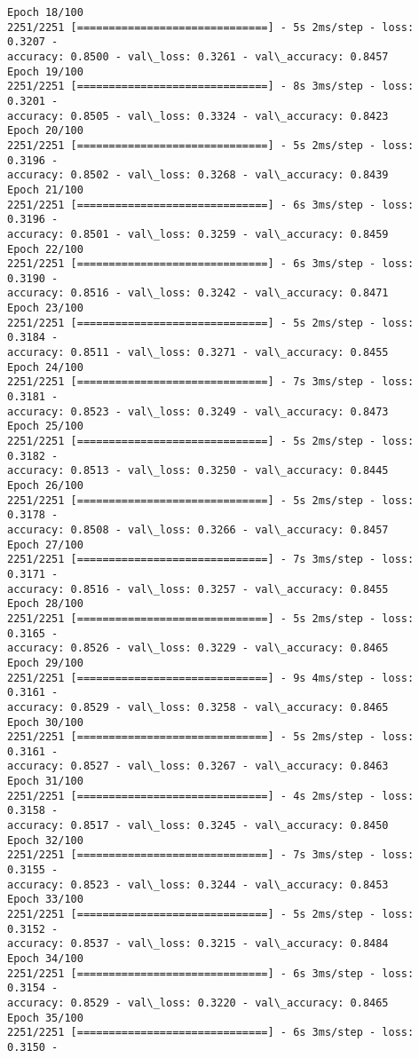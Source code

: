 \documentclass[11pt]{article}
\begin{document}
\begin{Verbatim}[commandchars=\\\{\}]
Epoch 18/100
2251/2251 [==============================] - 5s 2ms/step - loss: 0.3207 -
accuracy: 0.8500 - val\_loss: 0.3261 - val\_accuracy: 0.8457
Epoch 19/100
2251/2251 [==============================] - 8s 3ms/step - loss: 0.3201 -
accuracy: 0.8505 - val\_loss: 0.3324 - val\_accuracy: 0.8423
Epoch 20/100
2251/2251 [==============================] - 5s 2ms/step - loss: 0.3196 -
accuracy: 0.8502 - val\_loss: 0.3268 - val\_accuracy: 0.8439
Epoch 21/100
2251/2251 [==============================] - 6s 3ms/step - loss: 0.3196 -
accuracy: 0.8501 - val\_loss: 0.3259 - val\_accuracy: 0.8459
Epoch 22/100
2251/2251 [==============================] - 6s 3ms/step - loss: 0.3190 -
accuracy: 0.8516 - val\_loss: 0.3242 - val\_accuracy: 0.8471
Epoch 23/100
2251/2251 [==============================] - 5s 2ms/step - loss: 0.3184 -
accuracy: 0.8511 - val\_loss: 0.3271 - val\_accuracy: 0.8455
Epoch 24/100
2251/2251 [==============================] - 7s 3ms/step - loss: 0.3181 -
accuracy: 0.8523 - val\_loss: 0.3249 - val\_accuracy: 0.8473
Epoch 25/100
2251/2251 [==============================] - 5s 2ms/step - loss: 0.3182 -
accuracy: 0.8513 - val\_loss: 0.3250 - val\_accuracy: 0.8445
Epoch 26/100
2251/2251 [==============================] - 5s 2ms/step - loss: 0.3178 -
accuracy: 0.8508 - val\_loss: 0.3266 - val\_accuracy: 0.8457
Epoch 27/100
2251/2251 [==============================] - 7s 3ms/step - loss: 0.3171 -
accuracy: 0.8516 - val\_loss: 0.3257 - val\_accuracy: 0.8455
Epoch 28/100
2251/2251 [==============================] - 5s 2ms/step - loss: 0.3165 -
accuracy: 0.8526 - val\_loss: 0.3229 - val\_accuracy: 0.8465
Epoch 29/100
2251/2251 [==============================] - 9s 4ms/step - loss: 0.3161 -
accuracy: 0.8529 - val\_loss: 0.3258 - val\_accuracy: 0.8465
Epoch 30/100
2251/2251 [==============================] - 5s 2ms/step - loss: 0.3161 -
accuracy: 0.8527 - val\_loss: 0.3267 - val\_accuracy: 0.8463
Epoch 31/100
2251/2251 [==============================] - 4s 2ms/step - loss: 0.3158 -
accuracy: 0.8517 - val\_loss: 0.3245 - val\_accuracy: 0.8450
Epoch 32/100
2251/2251 [==============================] - 7s 3ms/step - loss: 0.3155 -
accuracy: 0.8523 - val\_loss: 0.3244 - val\_accuracy: 0.8453
Epoch 33/100
2251/2251 [==============================] - 5s 2ms/step - loss: 0.3152 -
accuracy: 0.8537 - val\_loss: 0.3215 - val\_accuracy: 0.8484
Epoch 34/100
2251/2251 [==============================] - 6s 3ms/step - loss: 0.3154 -
accuracy: 0.8529 - val\_loss: 0.3220 - val\_accuracy: 0.8465
Epoch 35/100
2251/2251 [==============================] - 6s 3ms/step - loss: 0.3150 -

\end{Verbatim}
\end{document}
